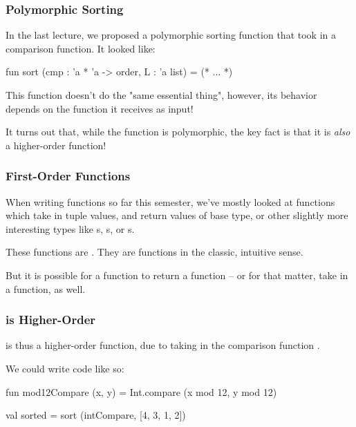 \documentclass[aspectratio=169, handout]{beamer}
\begin{document}
\begin{frame}[fragile]
  \frametitle{Polymorphic Sorting}

  In the last lecture, we proposed a polymorphic sorting function that took in a 
  comparison function. It looked like:

  \pause
  \vspace{\fill}

  \begin{codeblock}
    fun sort (cmp : 'a * 'a -> order, L : 'a list) = (* ... *)
  \end{codeblock}

  \pause
  \vspace{\fill}

  This  function doesn't do the "same essential thing", however,
  its behavior depends on the  function it receives as input!

  \pause
  \vspace{\fill}

  It turns out that, while the  function is polymorphic, the key
  fact is that it is \textit{also} a higher-order function!
\end{frame}

\begin{frame}[fragile]
  \frametitle{First-Order Functions}

  When writing functions so far this semester, we've mostly looked at functions which take
  in tuple values, and return values of base type, or other slightly more interesting types
  like s, s, or s.

  \pause
  \vspace{\fill}

  These functions are . They are functions in the classic, intuitive sense.

  \pause
  \vspace{\fill}

  But it is possible for a function to return a function -- or for that matter, take in a
  function, as well.

  \pause
  \vspace{\fill}

\end{frame}

\begin{frame}[fragile]
  \frametitle{ is Higher-Order}

   is thus a higher-order function, due to taking in the comparison function
  .

  \pause
  \vspace{\fill}

  We could write code like so:

  \begin{codeblock}
    fun mod12Compare (x, y) = Int.compare (x mod 12, y mod 12) 

    val sorted = sort (intCompare, [4, 3, 1, 2])
  \end{codeblock}
\end{frame}
\end{document}
